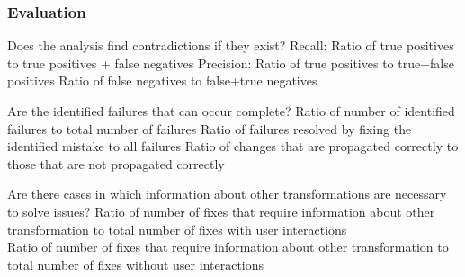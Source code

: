 \subsubsection*{Evaluation}

{Does the analysis find contradictions if they exist?}
{Recall: Ratio of true positives to true positives + false negatives}
{Precision: Ratio of true positives to true+false positives}
{Ratio of false negatives to false+true negatives}

{Are the identified failures that can occur complete?}
{Ratio of number of identified failures to total number of failures}
{Ratio of failures resolved by fixing the identified mistake to all failures}
{Ratio of changes that are propagated correctly to those that are not propagated correctly}

{Are there cases in which information about other transformations are necessary to solve issues?}
{Ratio of number of fixes that require information about other transformation to total number of fixes with user interactions\\
Ratio of number of fixes that require information about other transformation to total number of fixes without user interactions}



